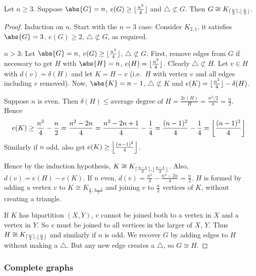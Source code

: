 \documentclass{article}
\DeclarePairedDelimiter\ceil{\lceil}{\rceil}
\DeclarePairedDelimiter\floor{\lfloor}{\rfloor}
\begin{document}
\begin{nthm}\label{thm:8}
    Let $n \geq 3$. Suppose $\abs{G} = n$, $e(G) \geq \floor{\frac{n^2}{4}}$ and $\triangle \not\subset G$.
    Then $G \cong K_{\ceil{\frac{n}{2}}, \floor{\frac{n}{2}}}$.
\end{nthm}
\begin{proof}
    Induction on $n$. Start with the $n=3$ case: Consider $K_{2, 1}$, it satisfies $\abs{G} = 3$, $e(G) \geq 2$, $\triangle \not\subset G$, as required.

    $n>3$: Let $\abs{G} = n$, $e(G) \geq \floor{\frac{n^2}{4}}$, $\triangle \not\subset G$.
    First, remove edges from $G$ if necessary to get $H$ with $\abs{H} = n$, $e(H) = \floor{\frac{n^2}{4}}$. Clearly $\triangle \not\subset H$.
    Let $v \in H$ with $d(v) = \delta(H)$ and let $K = H - v$ (i.e.\ $H$ with vertex $v$ and all edges including $v$ removed).
    Now, $\abs{K} = n-1$, $\triangle \not\subset K$ and $e(K) = \floor{\frac{n^2}{4}} - \delta(H)$.

    Suppose $n$ is even. Then $\delta(H) \leq \text{average degree of } H = \frac{2 e(H)}{H} = \frac{n^2/2}{n} = \frac{n}{2}$.
    Hence
    \begin{equation*}
    e(K) \geq \frac{n^2}{4} - \frac{n}{2} = \frac{n^2 - 2n}{4} = \frac{n^2 - 2n + 1}{4} - \frac{1}{4} = \frac{(n-1)^2}{4} - \frac{1}{4} = \floor*{\frac{(n-1)^2}{4}}\end{equation*}
    Similarly if $n$ odd, also get $e(K) \geq \floor*{\frac{(n-1)^2}{4}}$.

    Hence by the induction hypothesis, $K \cong K_{\ceil{\frac{n-1}{2}}, \floor{\frac{n-1}{2}}}$.
    Also, $d(v) = e(H) - e(K)$.
    If $n$ even, $d(v) = \frac{n^2}{4} - \frac{n^2 - 2n}{4} = \frac{n}{2}$.
    $H$ is formed by adding a vertex $v$ to $K \cong K_{\frac{n}{2}, \frac{n-2}{2}}$ and joining $v$ to $\frac{n}{2}$ vertices of $K$, without creating a triangle.

    If $K$ has bipartition $(X, Y)$, $v$ cannot be joined both to a vertex in $X$ and a vertex in $Y$. So $v$ must be joined to all vertices in the larger of $X$, $Y$.
    Thus $H \cong K_{\ceil{\frac{n}{2}}, \floor{\frac{n}{2}}}$ and similarly if $n$ is odd.
    We recover $G$ by adding edges to $H$ without making a $\triangle$. But any new edge creates a $\triangle$, so $G \cong H$.
\end{proof}




\subsubsection{Complete graphs}
\end{document}
